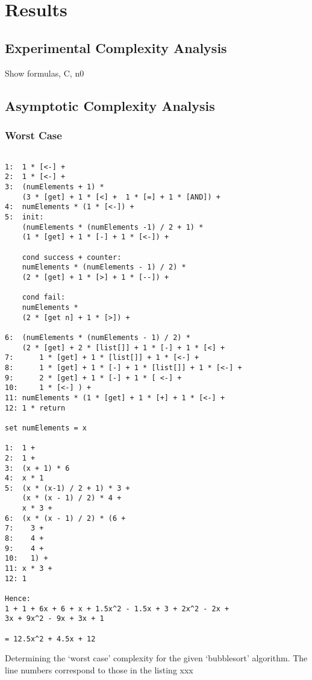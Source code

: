 \documentclass[a4paper,11pt,twoside]{article}
\begin{document}
\section{Results}
\subsection{Experimental Complexity Analysis}
Show formulas, C, n0

\subsection{Asymptotic Complexity Analysis}
\subsubsection{Worst Case}

\begin{listing}\label{ls:worst}
\begin{verbatim}

1:  1 * [<-] + 
2:  1 * [<-] + 
3:  (numElements + 1) * 
    (3 * [get] + 1 * [<] +  1 * [=] + 1 * [AND]) + 
4:  numElements * (1 * [<-]) +
5:  init:
    (numElements * (numElements -1) / 2 + 1) *
    (1 * [get] + 1 * [-] + 1 * [<-]) +
 
    cond success + counter: 
    numElements * (numElements - 1) / 2) *
    (2 * [get] + 1 * [>] + 1 * [--]) +

    cond fail:
    numElements * 
    (2 * [get n] + 1 * [>]) +

6:  (numElements * (numElements - 1) / 2) * 
    (2 * [get] + 2 * [list[]] + 1 * [-] + 1 * [<] + 
7:      1 * [get] + 1 * [list[]] + 1 * [<-] +
8:      1 * [get] + 1 * [-] + 1 * [list[]] + 1 * [<-] + 
9:      2 * [get] + 1 * [-] + 1 * [ <-] +
10:     1 * [<-] ) +
11: numElements * (1 * [get] + 1 * [+] + 1 * [<-] +
12: 1 * return

set numElements = x

1:  1 + 
2:  1 + 
3:  (x + 1) * 6  
4:  x * 1
5:  (x * (x-1) / 2 + 1) * 3 +
    (x * (x - 1) / 2) * 4 +
    x * 3 +
6:  (x * (x - 1) / 2) * (6 +
7:    3 + 
8:    4 +
9:    4 + 
10:   1) + 
11: x * 3 +
12: 1 

Hence:
1 + 1 + 6x + 6 + x + 1.5x^2 - 1.5x + 3 + 2x^2 - 2x + 
3x + 9x^2 - 9x + 3x + 1

= 12.5x^2 + 4.5x + 12

\end{verbatim}
\caption{Determining the `worst case' complexity for the given `bubblesort'
  algorithm. The line numbers correspond to those in the listing xxx}
\end{listing}
\end{document}
